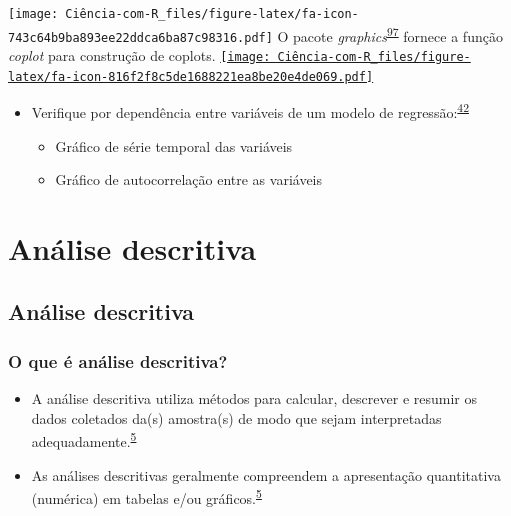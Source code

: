 \documentclass[
]{book}
\begin{document}
\texttt{[image: Ciência-com-R\_files/figure-latex/fa-icon-743c64b9ba893ee22ddca6ba87c98316.pdf]} O pacote \emph{graphics}\textsuperscript{\protect\hyperlink{ref-graphics}{97}} fornece a função \emph{coplot} para construção de coplots. \href{https://www.rdocumentation.org/packages/graphics/versions/3.6.2/topics/boxplot}{\texttt{[image: Ciência-com-R\_files/figure-latex/fa-icon-816f2f8c5de1688221ea8be20e4de069.pdf]}}

\begin{itemize}
\item
  Verifique por dependência entre variáveis de um modelo de regressão:\textsuperscript{\protect\hyperlink{ref-zuur2009}{42}}

  \begin{itemize}
  \item
    Gráfico de série temporal das variáveis
  \item
    Gráfico de autocorrelação entre as variáveis
  \end{itemize}
\end{itemize}

\hypertarget{analise-descritiva}{%
\chapter{\texorpdfstring{\textbf{Análise descritiva}}{Análise descritiva}}\label{analise-descritiva}}

\hypertarget{descritiva}{%
\section{Análise descritiva}\label{descritiva}}

\hypertarget{o-que-uxe9-anuxe1lise-descritiva}{%
\subsection{O que é análise descritiva?}\label{o-que-uxe9-anuxe1lise-descritiva}}

\begin{itemize}
\item
  A análise descritiva utiliza métodos para calcular, descrever e resumir os dados coletados da(s) amostra(s) de modo que sejam interpretadas adequadamente.\textsuperscript{\protect\hyperlink{ref-vetter2017}{5}}
\item
  As análises descritivas geralmente compreendem a apresentação quantitativa (numérica) em tabelas e/ou gráficos.\textsuperscript{\protect\hyperlink{ref-vetter2017}{5}}
\end{itemize}
\end{document}
